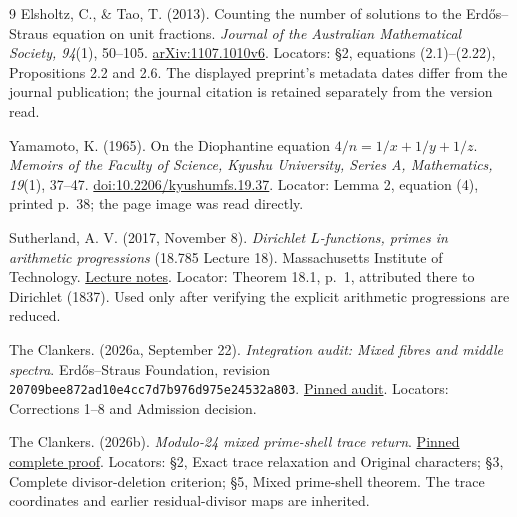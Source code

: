 \begin{thebibliography}{9}
Elsholtz, C., \& Tao, T. (2013). Counting the number of solutions to the
Erd\H{o}s--Straus equation on unit fractions. \emph{Journal of the Australian
Mathematical Society, 94}(1), 50--105.
\href{https://arxiv.org/abs/1107.1010}{arXiv:1107.1010v6}.
Locators: \S2, equations (2.1)--(2.22), Propositions 2.2 and 2.6.
The displayed preprint's metadata dates differ from the journal publication;
the journal citation is retained separately from the version read.

Yamamoto, K. (1965). On the Diophantine equation
$4/n=1/x+1/y+1/z$. \emph{Memoirs of the Faculty of Science, Kyushu University,
Series A, Mathematics, 19}(1), 37--47.
\href{https://doi.org/10.2206/kyushumfs.19.37}{doi:10.2206/kyushumfs.19.37}.
Locator: Lemma 2, equation (4), printed p.~38; the page image was read directly.

Sutherland, A. V. (2017, November 8). \emph{Dirichlet $L$-functions, primes
in arithmetic progressions} (18.785 Lecture 18). Massachusetts Institute of
Technology. \href{https://math.mit.edu/classes/18.785/2017fa/LectureNotes18.pdf}{Lecture notes}.
Locator: Theorem 18.1, p.~1, attributed there to Dirichlet (1837).
Used only after verifying the explicit arithmetic progressions are reduced.

The Clankers. (2026a, September 22). \emph{Integration audit: Mixed fibres
and middle spectra}. Erd\H{o}s--Straus Foundation, revision
\texttt{20709bee872ad10e4cc7d7b976d975e24532a803}.
\href{https://github.com/KokunoYumeto/erdos-straus-foundation/blob/20709bee872ad10e4cc7d7b976d975e24532a803/research/incoming/es-turn07-fibres-middle-spectrum-20260922/INTEGRATION_AUDIT.md}{Pinned audit}.
Locators: Corrections 1--8 and Admission decision.

The Clankers. (2026b). \emph{Modulo-24 mixed prime-shell trace return}.
\href{https://github.com/KokunoYumeto/erdos-straus-foundation/blob/20709bee872ad10e4cc7d7b976d975e24532a803/research/incoming/es-turn07-mod24-ray-trace-20260922/core.tex}{Pinned complete proof}.
Locators: \S2, Exact trace relaxation and Original characters; \S3,
Complete divisor-deletion criterion; \S5, Mixed prime-shell theorem.
The trace coordinates and earlier residual-divisor maps are inherited.
\end{thebibliography}
